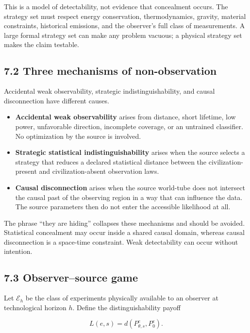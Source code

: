 \documentclass[11pt,a4paper]{article}
\begin{document}
This is a model of detectability, not evidence that concealment occurs. The strategy set must respect energy conservation, thermodynamics, gravity, material constraints, historical emissions, and the observer's full class of measurements. A large formal strategy set can make any problem vacuous; a physical strategy set makes the claim testable.

\subsection{7.2 Three mechanisms of non-observation}\label{72-three-mechanisms-of-non-observation}

Accidental weak observability, strategic indistinguishability, and causal disconnection have different causes.

\begin{itemize}
\item
  \textbf{Accidental weak observability} arises from distance, short lifetime, low power, unfavorable direction, incomplete coverage, or an untrained classifier. No optimization by the source is involved.
\item
  \textbf{Strategic statistical indistinguishability} arises when the source selects a strategy that reduces a declared statistical distance between the civilization-present and civilization-absent observation laws.
\item
  \textbf{Causal disconnection} arises when the source world-tube does not intersect the causal past of the observing region in a way that can influence the data. The source parameters then do not enter the accessible likelihood at all.
\end{itemize}

The phrase ``they are hiding'' collapses these mechanisms and should be avoided. Statistical concealment may occur inside a shared causal domain, whereas causal disconnection is a space-time constraint. Weak detectability can occur without intention.

\subsection{7.3 Observer--source game}\label{73-observersource-game}

Let \(\mathcal E_h\) be the class of experiments physically available to an observer at technological horizon \(h\). Define the distinguishability payoff

\begin{equation}
L(e,s)=d(P^e_{\theta,s},P^e_0).
\end{equation}
\end{document}

